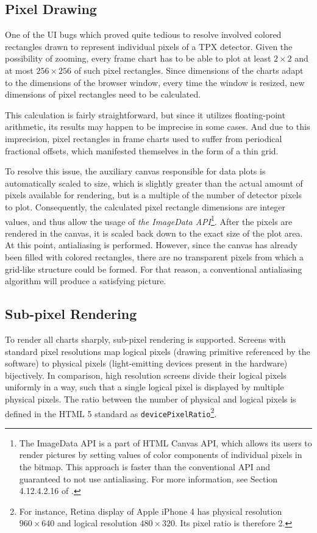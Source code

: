\subsection{Pixel Drawing}
One of the UI bugs which proved quite tedious to resolve involved colored rectangles drawn to represent individual pixels of a TPX detector. Given the possibility of zooming, every frame chart has to be able to plot at least $2\times 2$ and at most $256\times 256$ of such pixel rectangles. Since dimensions of the charts adapt to the dimensions of the browser window, every time the window is resized, new dimensions of pixel rectangles need to be calculated.

This calculation is fairly straightforward, but since it utilizes floating-point arithmetic, its results may happen to be imprecise in some cases. And due to this imprecision, pixel rectangles in frame charts used to suffer from periodical fractional offsets, which manifested themselves in the form of a thin grid.

To resolve this issue, the auxiliary canvas responsible for data plots is automatically scaled to size, which is slightly greater than the actual amount of pixels available for rendering, but is a multiple of the number of detector pixels to plot. Consequently, the calculated pixel rectangle dimensions are integer values, and thus allow the usage of \textit{the ImageData API}\footnote{The ImageData API is a part of HTML Canvas API, which allows its users to render pictures by setting values of color components of individual pixels in the bitmap. This approach is faster than the conventional API and guaranteed to not use antialiasing. For more information, see Section 4.12.4.2.16 of \cite{HtmlStandard}.}. After the pixels are rendered in the canvas, it is scaled back down to the exact size of the plot area. At this point, antialiasing is performed. However, since the canvas has already been filled with colored rectangles, there are no transparent pixels from which a grid-like structure could be formed. For that reason, a conventional antialiasing algorithm will produce a satisfying picture.

\subsection{Sub-pixel Rendering}
To render all charts sharply, sub-pixel rendering is supported. Screens with standard pixel resolutions map logical pixels (drawing primitive referenced by the software) to physical pixels (light-emitting devices present in the hardware) bijectively. In comparison, high resolution screens divide their logical pixels uniformly in a way, such that a single logical pixel is displayed by multiple physical pixels. The ratio between the number of physical and logical pixels is defined in the HTML 5 standard \cite{HtmlStandard} as \texttt{devicePixelRatio}\footnote{For instance, Retina display of Apple iPhone 4 has physical resolution $960\times 640$ and logical resolution $480\times 320$. Its pixel ratio is therefore 2.}.

